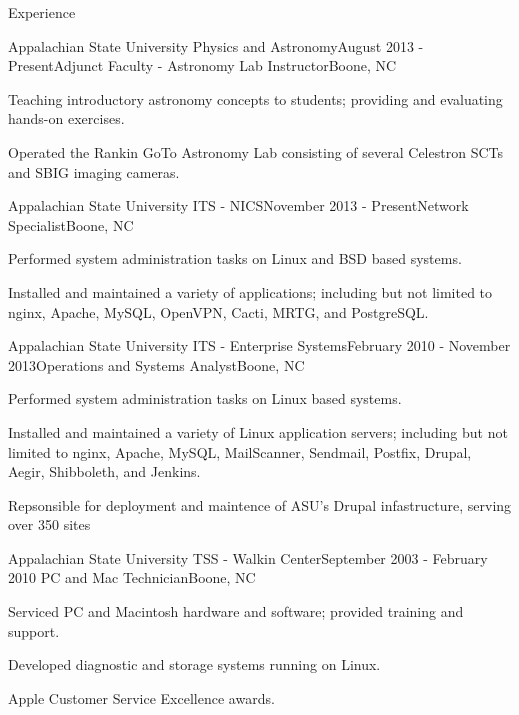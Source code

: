 \documentclass{cv} %
\begin{document}
\begin{rSection}{Experience}

\begin{rSubsection}{Appalachian State University Physics and Astronomy}{August 2013 - Present}{Adjunct Faculty - Astronomy Lab Instructor}{Boone, NC}
\item Teaching introductory astronomy concepts to students; providing and evaluating hands-on exercises.
\item Operated the Rankin GoTo Astronomy Lab consisting of several Celestron SCTs and SBIG imaging cameras.
\end{rSubsection}

\begin{rSubsection}{Appalachian State University ITS - NICS}{November 2013 - Present}{Network Specialist}{Boone, NC}
\item Performed system administration tasks on Linux and BSD based systems.
\item Installed and maintained a variety of applications; including but not limited to nginx, Apache, MySQL, OpenVPN, Cacti, MRTG, and PostgreSQL.
\end{rSubsection}

\begin{rSubsection}{Appalachian State University ITS - Enterprise Systems}{February 2010 - November 2013}{Operations and Systems Analyst}{Boone, NC}
\item Performed system administration tasks on Linux based systems.
\item Installed and maintained a variety of Linux application servers; including but not limited to nginx, Apache, MySQL, MailScanner, Sendmail, Postfix, Drupal, Aegir, Shibboleth, and Jenkins.
\item Repsonsible for deployment and maintence of ASU's Drupal infastructure, serving over 350 sites
\end{rSubsection}

\begin{rSubsection}{Appalachian State University TSS - Walkin Center}{September 2003 - February 2010
}{PC and Mac Technician}{Boone, NC}
\item Serviced PC and Macintosh hardware and software; provided training and support.
\item Developed diagnostic and storage systems running on Linux.
\item Apple Customer Service Excellence awards.
\end{rSubsection}


\end{rSection}
\end{document}
